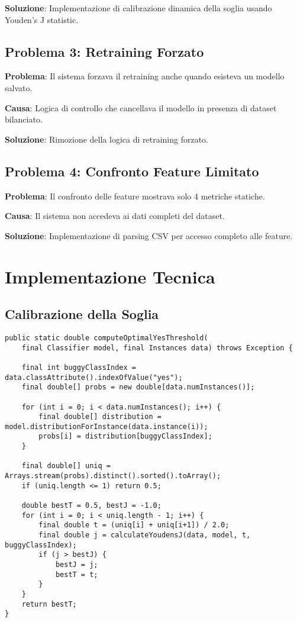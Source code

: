 \documentclass[12pt,a4paper]{article}
\begin{document}
\textbf{Soluzione}: Implementazione di calibrazione dinamica della soglia usando Youden's J statistic.

\subsection{Problema 3: Retraining Forzato}

\textbf{Problema}: Il sistema forzava il retraining anche quando esisteva un modello salvato.

\textbf{Causa}: Logica di controllo che cancellava il modello in presenza di dataset bilanciato.

\textbf{Soluzione}: Rimozione della logica di retraining forzato.

\subsection{Problema 4: Confronto Feature Limitato}

\textbf{Problema}: Il confronto delle feature mostrava solo 4 metriche statiche.

\textbf{Causa}: Il sistema non accedeva ai dati completi del dataset.

\textbf{Soluzione}: Implementazione di parsing CSV per accesso completo alle feature.

\section{Implementazione Tecnica}

\subsection{Calibrazione della Soglia}

\begin{lstlisting}[caption=Implementazione della calibrazione della soglia]
public static double computeOptimalYesThreshold(
    final Classifier model, final Instances data) throws Exception {
    
    final int buggyClassIndex = data.classAttribute().indexOfValue("yes");
    final double[] probs = new double[data.numInstances()];
    
    for (int i = 0; i < data.numInstances(); i++) {
        final double[] distribution = model.distributionForInstance(data.instance(i));
        probs[i] = distribution[buggyClassIndex];
    }
    
    final double[] uniq = Arrays.stream(probs).distinct().sorted().toArray();
    if (uniq.length <= 1) return 0.5;
    
    double bestT = 0.5, bestJ = -1.0;
    for (int i = 0; i < uniq.length - 1; i++) {
        final double t = (uniq[i] + uniq[i+1]) / 2.0;
        final double j = calculateYoudensJ(data, model, t, buggyClassIndex);
        if (j > bestJ) {
            bestJ = j;
            bestT = t;
        }
    }
    return bestT;
}
\end{lstlisting}
\end{document}
